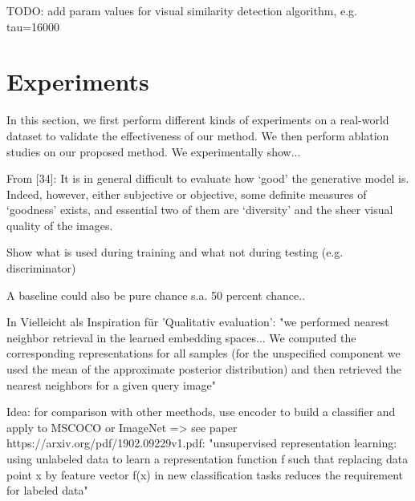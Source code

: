 \documentclass[12pt,a4paper]{article}
\begin{document}
TODO: add param values for visual similarity detection algorithm, e.g. tau=16000

\newpage
\section{Experiments}\label{sec:experiments}
In this section, we first perform different kinds of experiments on a real-world dataset to validate the
effectiveness of our method. We then perform ablation studies on our proposed
method. 
We experimentally show...


From [34]: It is in general difficult to evaluate how ‘good’ the generative model is. Indeed, however, either subjective or objective, some definite measures of ‘goodness’ exists, and essential two of them are ‘diversity’ and the sheer visual quality of the images.

\par Show what is used during training and what not during testing (e.g. discriminator)
    
\par A baseline could also be pure chance s.a. 50 percent chance..

\par In \cite{1611.03383} Vielleicht als Inspiration für 'Qualitativ evaluation': "we performed nearest neighbor retrieval in the learned embedding spaces... We computed the corresponding representations for all samples (for the unspecified component we used the mean of the approximate posterior distribution) and then retrieved the nearest neighbors for a given query image"

\par Idea: for comparison with other meethods, use encoder to build a classifier and apply to MSCOCO or ImageNet => see paper https://arxiv.org/pdf/1902.09229v1.pdf: "unsupervised representation learning: using unlabeled data to learn a representation function f such that replacing data point x by feature vector f(x) in new classification tasks reduces the requirement for labeled data"
\end{document}
